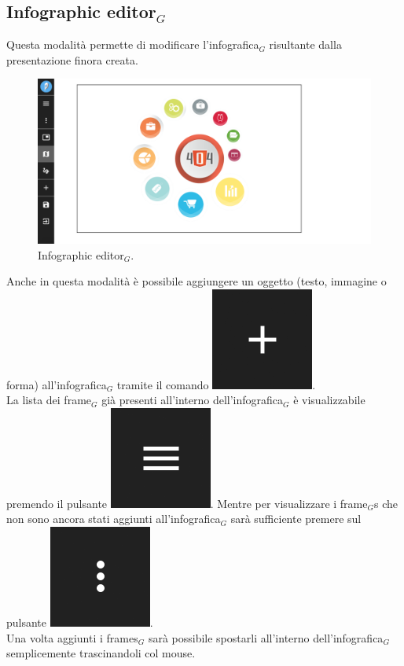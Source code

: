 \newpage
\subsection{Infographic editor$_G$}
Questa modalità permette di modificare l'infografica$_G$ risultante dalla presentazione finora creata.
\begin{figure}[!h]
\begin{center}
\includegraphics[scale=0.35]{img/infographic.png}
\caption{Infographic editor$_G$.}
\end{center}
\end{figure}

Anche in questa modalità è possibile aggiungere un oggetto (testo, immagine o forma) all'infografica$_G$ tramite il comando \includegraphics[scale=0.4]{img/add_object.png}.\\
La lista dei frame$_G$ già presenti all'interno dell'infografica$_G$ è visualizzabile premendo il pulsante \includegraphics[scale=0.4]{img/added_frames.png}.
Mentre per visualizzare i frame$_G$s che non sono ancora stati aggiunti all'infografica$_G$ sarà sufficiente premere sul pulsante \includegraphics[scale=0.4]{img/frames_to_be_added.png}.\\
Una volta aggiunti i frames$_G$ sarà possibile spostarli all'interno dell'infografica$_G$ semplicemente trascinandoli col mouse.

